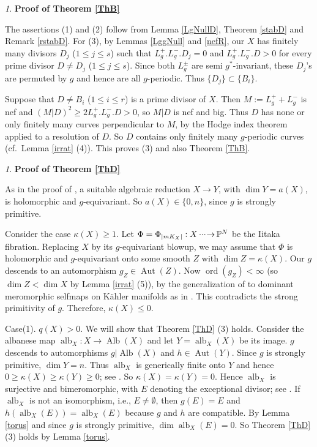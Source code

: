 \documentclass[11pt,a4paper,psamsfonts]{amsart}
\theoremstyle{plain}
\theoremstyle{definition}
\theoremstyle{remark}
\newtheorem{setup}[thm]{}
\begin{document}
\begin{setup}
{\bf Proof of Theorem \ref{ThB}}
\end{setup}

The assertions (1) and (2) follow from Lemma \ref{LgNullD}, Theorem \ref{stabD}
and Remark \ref{rstabD}.
For (3), by Lemmas \ref{LggNull} and \ref{nefR}, our $X$ has finitely many divisors
$D_j$ ($1 \le j \le s$) such that $L_g^+ . L_g^- . D_j = 0$ and
$L_g^+ . L_g^- . D > 0$
for every prime divisor $D \ne D_j$ ($1 \le j \le s$).
Since both $L_g^{\pm}$ are semi $g^*$-invariant, these $D_j$'s are permuted
by $g$ and hence are all $g$-periodic.
Thus $\{D_j\} \subset \{B_i\}$.

Suppose that $D \ne B_i$ ($1 \le i \le r$) is a prime divisor of $X$.
Then $M:= L_g^+ + L_g^-$ is nef and
$(M|D)^2 \ge 2L_g^+ . L_g^- . D > 0$, so $M|D$ is nef and big.
Thus $D$ has none or only finitely many curves perpendicular to $M$,
by the Hodge index theorem applied to a resolution of $D$.
So $D$ contains only finitely many $g$-periodic curves (cf.~Lemma \ref{irrat} (4)).
This proves (3) and also Theorem \ref{ThB}.

\begin{setup}
{\bf Proof of Theorem \ref{ThD}}
\end{setup}

As in the proof of \cite[Lemma 2.16]{Z3}, a suitable algebraic reduction
$X \to Y$, with $\dim Y = a(X)$, is holomorphic and $g$-equivariant.
So $a(X) \in \{0, n\}$, since $g$ is strongly primitive.

Consider the case $\kappa(X) \ge 1$. Let
$\Phi = \Phi_{|mK_X|} : X {{\,\cdot\negmedspace\cdot\negmedspace\cdot\negmedspace\to\,}} {\mathbb{P}}^{N}$ be the Iitaka fibration.
Replacing $X$ by its $g$-equivariant blowup, we may assume that
$\Phi$ is holomorphic and $g$-equivariant
onto some smooth $Z$ with $\dim Z = \kappa(X)$.
Our $g$ descends to an automorphism $g_Z \in {\operatorname{Aut}}(Z)$.
Now ${\operatorname{ord}}(g_Z) < \infty$ (so $\dim Z < \dim X$ by Lemma \ref{irrat} (5)), by the generalization of
\cite[Theorem 14.10]{Ue} to dominant
meromorphic selfmaps on K\"ahler manifolds as in \cite[Theorem A or Corollary 2.4]{NZ}.
This contradicts the strong primitivity of $g$.
Therefore, $\kappa(X) \le 0$.

Case(1). $q(X) > 0$. We will show that
Theorem \ref{ThD} (3) holds.
Consider the albanese map ${\operatorname{alb}}_X : X \to {\operatorname{Alb}}(X)$
and let $Y = {\operatorname{alb}}_X(X)$ be its image. $g$ descends to automorphisms $g | {\operatorname{Alb}}(X)$
and $h \in {\operatorname{Aut}}(Y)$. Since $g$ is strongly primitive,
$\dim Y = n$. Thus ${\operatorname{alb}}_X$ is generically finite onto $Y$
and hence $0 \ge \kappa(X) \ge \kappa(Y) \ge 0$; see \cite[Lemma 10.1]{Ue}.
So $\kappa(X) = \kappa(Y) = 0$.
Hence ${\operatorname{alb}}_X$ is surjective and bimeromorphic, with $E$ denoting the exceptional divisor;
see \cite[Theorem 24]{Ka}.
If ${\operatorname{alb}}_X$ is not an isomorphism, i.e., $E \ne \emptyset$, then $g(E) = E$ and
$h({\operatorname{alb}}_X(E)) = {\operatorname{alb}}_X(E)$ because
$g$ and $h$ are compatible.
By Lemma \ref{torus} and since $g$ is strongly primitive, $\dim {\operatorname{alb}}_X(E) = 0$.
So Theorem \ref{ThD} (3) holds by Lemma \ref{torus}.
\end{document}
